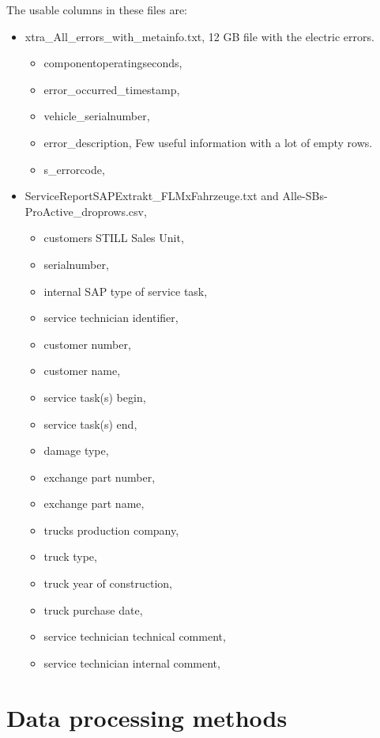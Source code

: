 The usable columns in these files are:
\begin{itemize}
	\item{xtra\_All\_errors\_with\_metainfo.txt,} 12 GB file with the electric errors.
	\begin{itemize}
		\item{componentoperatingseconds,}
		\item{error\_occurred\_timestamp,}
		\item{vehicle\_serialnumber,}
		\item{error\_description,} Few useful information with a lot of empty rows.
		\item{s\_errorcode,}
	\end{itemize}
	\item{ServiceReportSAPExtrakt\_FLMxFahrzeuge.txt and Alle-SBs-ProActive\_droprows.csv,}
	\begin{itemize}
		\item{customers STILL Sales Unit,}
		\item{serialnumber,}
		\item{internal SAP type of service task,}
		\item{service technician identifier,}
		\item{customer number,}
		\item{customer name,}
		\item{service task(s) begin},
		\item{service task(s) end,}
		\item{damage type,}
		\item{exchange part number,}
		\item{exchange part name,}
		\item{trucks production company},
		\item{truck type,}
		\item{truck year of construction,}
		\item{truck purchase date,}
		\item{service technician technical comment,}
		\item{service technician internal comment,}
	\end{itemize}
\end{itemize}
	\section{Data processing methods}
